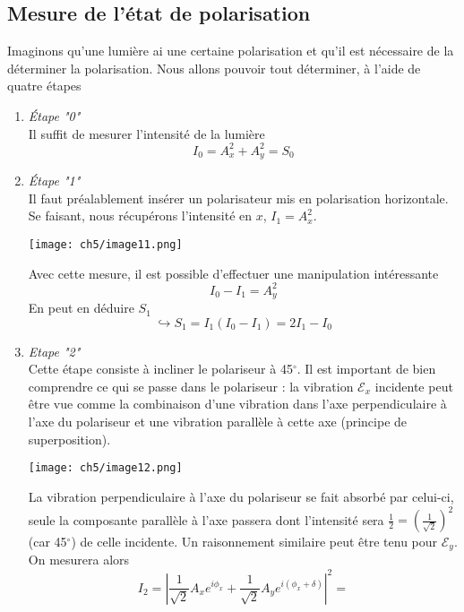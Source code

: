 	\subsection{Mesure de l'état de polarisation}
	Imaginons qu'une lumière ai une certaine polarisation et qu'il est nécessaire de la déterminer 
	la polarisation. Nous allons pouvoir tout déterminer, à l'aide de quatre étapes 
	\begin{enumerate}
	\item \textit{Étape "0"}\\
	Il suffit de mesurer l'intensité de la lumière
	\begin{equation}
	I_0 = A_x^2+A_y^2 = S_0
	\end{equation}
	\item \textit{Étape "1"}\\
	Il faut préalablement insérer un polarisateur mis en polarisation horizontale. Se faisant, 
	nous récupérons l'intensité en $x$, $I_1=A_x^2$. 
	\begin{center}
	\texttt{[image: ch5/image11.png]}
	\end{center}	
	Avec cette mesure, il est possible d'effectuer 
	une manipulation intéressante
	\begin{equation}
	I_0-I_1 = A_y^2
	\end{equation}
	En peut en déduire $S_1$
	\begin{equation}
	\hookrightarrow S_1 = I_1(I_0-I_1) = 2I_1-I_0
	\end{equation}
	\item \textit{Etape "2"}\\
	Cette étape consiste à incliner le polariseur à 45$^\circ$. Il est important de bien comprendre 
	ce qui se passe dans le polariseur : la vibration $\mathcal{E}_x$ incidente peut être vue comme 
	la combinaison d'une vibration dans l'axe perpendiculaire à l'axe du polariseur  et une vibration 
	parallèle à cette axe (principe de superposition). 
	\begin{center}
	\texttt{[image: ch5/image12.png]}
	\end{center}		
	La vibration perpendiculaire à l'axe du polariseur 
	se fait absorbé par celui-ci, seule la composante parallèle à l'axe passera dont l'intensité sera 
	$\frac{1}{2}=\left(\frac{1}{\sqrt{2}}\right)^2$ (car 45$^\circ$)  de celle incidente. Un raisonnement similaire peut être tenu 
	pour $\mathcal{E}_y$. On mesurera alors
	\begin{equation}
	I_2 = \left|\dfrac{1}{\sqrt{2}}A_xe^{i\phi_x}+\dfrac{1}{\sqrt{2}}A_ye^{i(\phi_x+\delta)}\right|^2 = 

\end{equation}
\end{enumerate}
